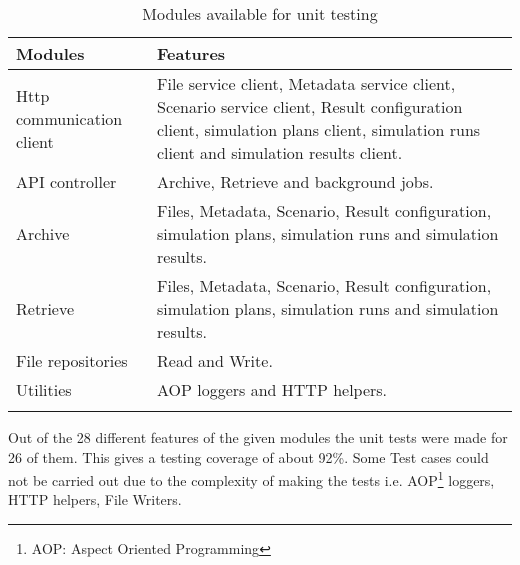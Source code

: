 \begin{longtable}{|p{3cm}|p{10cm}|}
    \hline
        \textbf{Modules} & \textbf{Features}\\
    \hline
        Http communication client & File service client, Metadata service client, Scenario service client, Result configuration client, simulation plans client, 
        simulation runs client and simulation results client.\\    
    \hline
        API controller & Archive, Retrieve and background jobs.\\    
    \hline
        Archive & Files, Metadata, Scenario, Result configuration, simulation plans, simulation runs and simulation results.\\  
    \hline
        Retrieve & Files, Metadata, Scenario, Result configuration, simulation plans, simulation runs and simulation results.\\ 
    \hline
        File repositories & Read and Write.\\ 
    \hline
        Utilities & AOP loggers and HTTP helpers.\\ 
    \hline
    \caption{Modules available for unit testing}
    \label{table:unitTestCov} 
\end{longtable}

Out of the 28 different features of the given modules the unit tests were made for 26 of them. This gives a testing coverage of about
92\%. Some Test cases could not be carried out due to the complexity of making the tests i.e. AOP\footnote{AOP: Aspect Oriented Programming} loggers, HTTP helpers, File Writers.